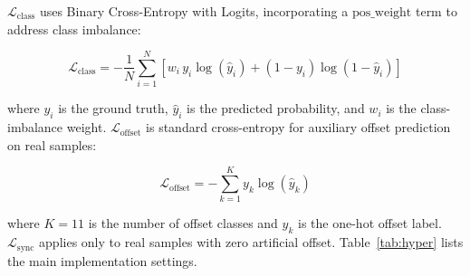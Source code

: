 \documentclass[pdflatex,sn-mathphys-num]{sn-jnl}
\begin{document}
$\mathcal{L}_{\text{class}}$ uses Binary Cross-Entropy with Logits, incorporating a $\text{pos\_weight}$ term to address class imbalance:

\begin{equation}\label{eq7}
\mathcal{L}_{\text{class}} = -\frac{1}{N} \sum_{i=1}^{N} \left[ w_i \, y_i \log(\hat{y}_i) + (1 - y_i) \log(1 - \hat{y}_i) \right]
\end{equation}

where $y_i$ is the ground truth, $\hat{y}_i$ is the predicted probability, and $w_i$ is the class-imbalance weight. $\mathcal{L}_{\text{offset}}$ is standard cross-entropy for auxiliary offset prediction on real samples:

\begin{equation}\label{eq8}
\mathcal{L}_{\text{offset}} = -\sum_{k=1}^{K} y_k \log(\hat{y}_k)
\end{equation}

where $K=11$ is the number of offset classes and $y_k$ is the one-hot offset label. $\mathcal{L}_{\text{sync}}$ applies only to real samples with zero artificial offset. Table~\ref{tab:hyper} lists the main implementation settings.
\end{document}
